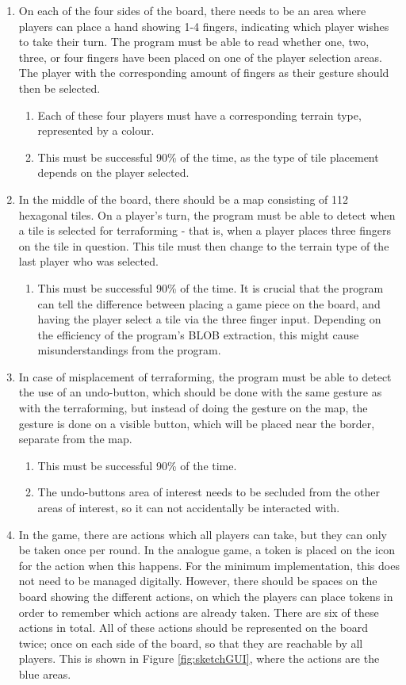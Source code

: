 \begin{enumerate}
\item On each of the four sides of the board, there needs to be an area where players can place a hand showing 1-4 fingers, indicating which player wishes to take their turn. The program must be able to read whether one, two, three, or four fingers have been placed on one of the player selection areas. The player with the corresponding amount of fingers as their gesture should then be selected.
	\begin{enumerate}
	\item Each of these four players must have a corresponding terrain type, represented by a colour.
	\item This must be successful 90\% of the time, as the type of tile placement depends on the player selected.
	\end{enumerate}
\item In the middle of the board, there should be a map consisting of 112 hexagonal tiles. On a player's turn, the program must be able to detect when a tile is selected for terraforming - that is, when a player places three fingers on the tile in question. This tile must then change to the terrain type of the last player who was selected.
	\begin{enumerate}
	\item This must be successful 90\% of the time. It is crucial that the program can tell the difference between placing a game piece on the board, and having the player select a tile via the three finger input. Depending on the efficiency of the program’s BLOB extraction, this might cause misunderstandings from the program.
	\end{enumerate}
\item In case of misplacement of terraforming, the program must be able to detect the use of an undo-button, which should be done with the same gesture as with the terraforming, but instead of doing the gesture on the map, the gesture is done on a visible button, which will be placed near the border, separate from the map.
	\begin{enumerate}
	\item This must be successful 90\% of the time.
	\item The undo-buttons area of interest needs to be secluded from the other areas of interest, so it can not accidentally be interacted with. 
	\end{enumerate}
\item In the game, there are actions which all players can take, but they can only be taken once per round. In the analogue game, a token is placed on the icon for the action when this happens. For the minimum implementation, this does not need to be managed digitally. However, there should be spaces on the board showing the different actions, on which the players can place tokens in order to remember which actions are already taken. There are six of these actions in total. All of these actions should be represented on the board twice; once on each side of the board, so that they are reachable by all players. This is shown in Figure \ref{fig:sketchGUI}, where the actions are the blue areas. 

\end{enumerate}
